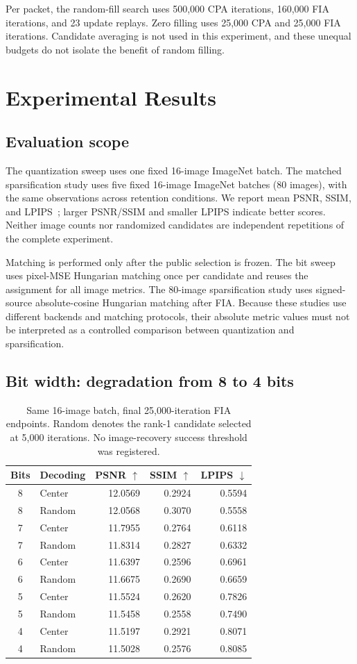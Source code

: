 \documentclass{article}
\begin{document}
Per packet, the random-fill search uses 500,000 CPA iterations, 160,000 FIA
iterations, and 23 update replays. Zero filling uses 25,000 CPA and 25,000
FIA iterations. Candidate averaging is not used in this experiment, and
these unequal budgets do not isolate the benefit of random filling.

\section{Experimental Results}
\label{sec:results}
\subsection{Evaluation scope}
The quantization sweep uses one fixed 16-image ImageNet batch. The matched
sparsification study uses five fixed 16-image ImageNet batches (80 images),
with the same observations across retention conditions. We report mean
PSNR, SSIM, and LPIPS~\cite{zhang2018lpips}; larger PSNR/SSIM and smaller
LPIPS indicate better scores. Neither image counts nor randomized
candidates are independent repetitions of the complete experiment.

Matching is performed only after the public selection is frozen. The bit
sweep uses pixel-MSE Hungarian matching once per candidate and reuses the
assignment for all image metrics. The 80-image sparsification study uses
signed-source absolute-cosine Hungarian matching after FIA. Because these
studies use different backends and matching protocols, their absolute
metric values must not be interpreted as a controlled comparison between
quantization and sparsification.

\subsection{Bit width: degradation from 8 to 4 bits}
\begin{table}[t]
\centering
\caption{Same 16-image batch, final 25,000-iteration FIA endpoints.
Random denotes the rank-1 candidate selected at 5,000 iterations.
No image-recovery success threshold was registered.}
\label{tab:bits}
\small
\begin{tabular}{clrrr}
\toprule
Bits & Decoding & PSNR $\uparrow$ & SSIM $\uparrow$ & LPIPS $\downarrow$\\
\midrule
8 & Center & 12.0569 & 0.2924 & 0.5594\\
8 & Random & 12.0568 & 0.3070 & 0.5558\\
7 & Center & 11.7955 & 0.2764 & 0.6118\\
7 & Random & 11.8314 & 0.2827 & 0.6332\\
6 & Center & 11.6397 & 0.2596 & 0.6961\\
6 & Random & 11.6675 & 0.2690 & 0.6659\\
5 & Center & 11.5524 & 0.2620 & 0.7826\\
5 & Random & 11.5458 & 0.2558 & 0.7490\\
4 & Center & 11.5197 & 0.2921 & 0.8071\\
4 & Random & 11.5028 & 0.2576 & 0.8085\\
\bottomrule
\end{tabular}
\end{table}
\end{document}
